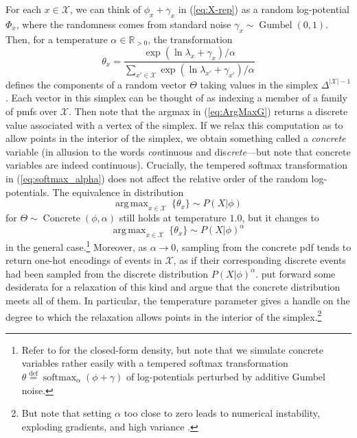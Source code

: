 \documentclass[11pt]{article}
\DeclareMathOperator*{\argmax}{arg\,max}
\DeclareMathOperator*{\softmax}{softmax}
\DeclareMathOperator*{\Gumbel}{Gumbel}
\DeclareMathOperator*{\Concrete}{Concrete}
\newcommand{\defeq}{\stackrel{\text{def}}{=}}
\begin{document}
For each $x \in \mathcal X$, we can think of $\phi_x + \gamma_x$ in (\ref{eq:X-rep}) as a random log-potential $\Phi_x$, where the randomness comes from standard noise $\gamma_x \sim \Gumbel(0, 1)$.
Then, for a temperature $\alpha \in \mathbb R_{>0}$, the transformation
\begin{equation}\label{eq:softmax_alpha}
\theta_x = \frac{\exp(\ln \lambda_x + \gamma_x)/\alpha}{\sum_{x' \in \mathcal X}\exp(\ln \lambda_{x'} + \gamma_{x'})/\alpha} 
\end{equation}
defines the components of a random vector $\Theta$ taking values in the simplex $\Delta^{|\mathcal X|-1}$.
Each vector in this simplex can be thought of as indexing a member of a family of pmfs over $\mathcal X$.
Then note that the argmax in (\ref{eq:ArgMaxG}) returns a discrete value associated with a vertex of the simplex. 
If we relax this computation as to allow points in the interior of the simplex, we obtain something \citet{MaddisonEtAl2017:Concrete} called a \emph{concrete} variable (in allusion to the words \emph{con}tinuous and dis\emph{crete}---but note that concrete variables are indeed continuous). %
Crucially, the tempered softmax transformation in (\ref{eq:softmax_alpha}) does not affect the relative order of the random log-potentials. 
The equivalence in distribution  
\begin{equation}\label{eq:ArgMaxG}
	\argmax_{x \in \mathcal X} ~ \{\theta_x\} \sim P(X|\phi) ~
\end{equation}
for $\Theta \sim \Concrete(\phi, \alpha)$ still holds at temperature $1.0$, but it changes to 
\begin{equation}\label{eq:ArgMaxGAlpha}
	\argmax_{x \in \mathcal X} ~ \{\theta_x\} \sim P(X|\phi)^\alpha ~
\end{equation}
in the general case.\footnote{Refer to \citep{MaddisonEtAl2017:Concrete} for the closed-form density, but note that we simulate concrete variables rather easily with a tempered softmax transformation $\theta \defeq \softmax_\alpha(\phi + \gamma)$ of log-potentials perturbed by additive Gumbel noise.}
Moreover, as $\alpha \to 0$, sampling from the concrete pdf tends to return one-hot encodings of events in $\mathcal X$, as if their corresponding discrete events had been sampled from the discrete distribution $P(X|\phi)^\alpha$. 
\citet{MaddisonEtAl2017:Concrete} put forward some desiderata for a relaxation of this kind and argue that the concrete distribution meets all of them. 
In particular, the temperature parameter gives a handle on the degree to which the relaxation allows points in the interior of the simplex.\footnote{But note that setting $\alpha$ too close to zero leads to numerical instability, exploding gradients, and high variance \citep{MaddisonEtAl2017:Concrete,JangEtAl2017:GumbelSoftmax}.}
\end{document}
